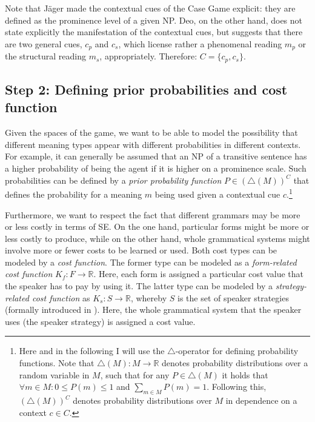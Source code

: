 \documentclass[output=paper,hidelinks]{langscibook}
\begin{document}
Note that Jäger made the contextual cues of the Case Game explicit: they are defined as the prominence level of a given NP. 
Deo, on the other hand, does not state explicitly the manifestation of the contextual cues, but suggests that there are two general  cues, $c_p$ and $c_s$, which license rather a phenomenal reading $m_p$ or the structural reading $m_s$, appropriately. Therefore: $C =  \{c_{p}, c_{s} \}$. 


\subsection{Step 2: Defining prior probabilities and cost function}
\label{sec:step2}

Given the spaces of the game, we want to be able to model the possibility that different meaning types appear with different probabilities in different contexts.  For example, it can generally be assumed that an NP of a transitive sentence has a higher probability of being the agent if it is higher on a prominence scale. Such probabilities can be defined by a \emph{prior probability function} $P \in (\bigtriangleup(M))^C$ that defines the probability for a meaning $m$ being used given a contextual cue $c$.\footnote{Here and in the following I will use the $\bigtriangleup$-operator for defining probability functions. Note that $\bigtriangleup(M): M \rightarrow \mathbb{R}$ denotes probability distributions over a random variable in $M$, such that  for any $P \in \bigtriangleup(M)$ it holds that $\forall m \in M: 0 \leq P(m) \leq 1$ and $\sum_{m \in M} P(m) = 1$.  Following this, $(\bigtriangleup(M))^C$ denotes probability distributions over  $M$ in dependence on a context $c \in C$. } 

Furthermore, we want to respect the fact that different grammars may be more or less costly in terms of SE. On the one hand, particular forms might be more or less costly to produce, while on the other hand, whole grammatical systems might involve more or fewer costs to be learned or used. Both cost types 
can be modeled by a \emph{cost function}. The former type can be modeled as a \emph{form-related cost function} $K_f: F \rightarrow  \mathbb{R}$. Here, each form is assigned a particular cost value that the speaker has to pay by using it. The latter type  can be modeled by a \emph{strategy-related cost function} as $K_s: S \rightarrow  \mathbb{R}$, whereby $S$ is the set of speaker strategies (formally introduced in ). Here, the whole grammatical system that the speaker uses (the speaker strategy) is assigned a cost value.
\end{document}
